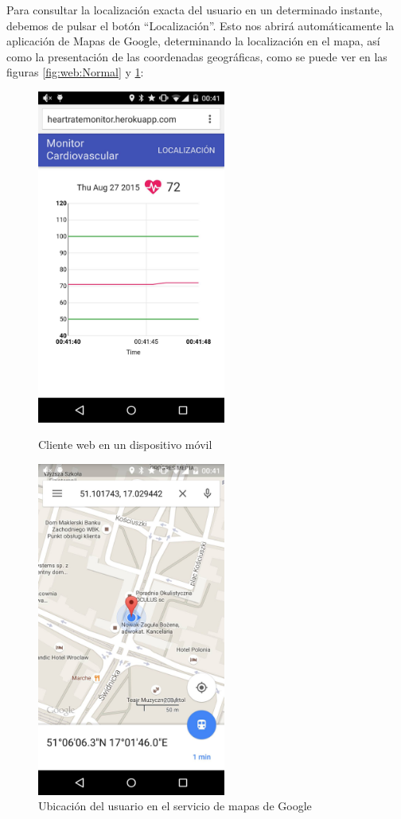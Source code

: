 Para consultar la localización exacta del usuario en un determinado instante, debemos de pulsar el botón ``Localización''. Esto nos abrirá automáticamente la aplicación de Mapas de Google, determinando la localización en el mapa, así como la presentación de las coordenadas geográficas, como se puede ver en las figuras \ref{fig:web:Normal} y \ref{fig:web:Mapa}:

\begin{figure}[H] \centering
	\begin{minipage}{0.45\textwidth}\centering
		\includegraphics[height=11cm]{graphs/AndroidEmitiendo.png} \caption{Cliente web en un dispositivo móvil}\label{fig:web:Normal}
	\end{minipage}
	\hfill
	\begin{minipage}{0.45\textwidth}\centering
		\includegraphics[height=11cm]{graphs/AndroidMapas.png} \caption{Ubicación del usuario en el servicio de mapas de Google}\label{fig:web:Mapa}
	\end{minipage}
\end{figure}

